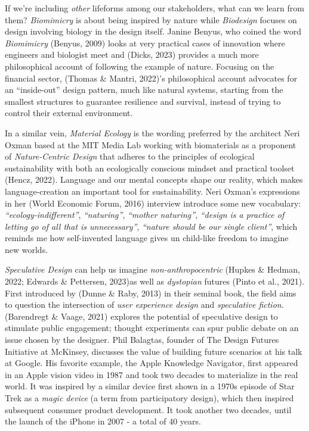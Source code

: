 \documentclass[
  letterpaper,
  DIV=11,
  numbers=noendperiod]{scrartcl}
\begin{document}
If we're including \emph{other} lifeforms among our stakeholders, what
can we learn from them? \emph{Biomimicry} is about being inspired by
nature while \emph{Biodesign} focuses on design involving biology in the
design itself. Janine Benyus, who coined the word \emph{Biomimicry}
(Benyus, 2009) looks at very practical cases of innovation where
engineers and biologist meet and (Dicks, 2023) provides a much more
philosophical account of following the example of nature. Focusing on
the financial sector, (Thomas \& Mantri, 2022)'s philosophical account
advocates for an ``inside-out'' design pattern, much like natural
systems, starting from the smallest structures to guarantee resilience
and survival, instead of trying to control their external environment.

In a similar vein, \emph{Material Ecology} is the wording preferred by
the architect Neri Oxman based at the MIT Media Lab working with
biomaterials as a proponent of \emph{Nature-Centric Design} that adheres
to the principles of ecological sustainability with both an ecologically
conscious mindset and practical toolset (Hencz, 2022). Language and our
mental concepts shape our reality, which makes language-creation an
important tool for sustainability. Neri Oxman's expressions in her
(World Economic Forum, 2016) interview introduce some new vocabulary:
\emph{``ecology-indifferent''}, \emph{``naturing''}, \emph{``mother
naturing''}, \emph{``design is a practice of letting go of all that is
unnecessary''}, \emph{``nature should be our single client''}, which
reminds me how self-invented language gives un child-like freedom to
imagine new worlds.

\emph{Speculative Design} can help us imagine \emph{non-anthropocentric}
(Hupkes \& Hedman, 2022; Edwards \& Pettersen, 2023)as well as
\emph{dystopian} futures (Pinto et al., 2021). First introduced by
(Dunne \& Raby, 2013) in their seminal book, the field aims to question
the intersection of \emph{user experience design} and \emph{speculative
fiction}. (Barendregt \& Vaage, 2021) explores the potential of
speculative design to stimulate public engagement; thought experiments
can spur public debate on an issue chosen by the designer. Phil
Balagtas, founder of The Design Futures Initiative at McKinsey,
discusses the value of building future scenarios at his talk at Google.
His favorite example, the Apple Knowledge Navigator, first appeared in
an Apple vision video in 1987 and took two decades to materialize in the
real world. It was inspired by a similar device first shown in a 1970s
episode of Star Trek as a \emph{magic device} (a term from participatory
design), which then inspired subsequent consumer product development. It
took another two decades, until the launch of the iPhone in 2007 - a
total of 40 years.
\end{document}
